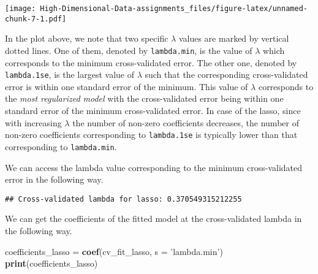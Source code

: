 \documentclass[
]{book}
\newenvironment{Shaded}{\begin{snugshade}}{\end{snugshade}}
\newcommand{\DataTypeTok}[1]{\textcolor[rgb]{0.13,0.29,0.53}{#1}}
\newcommand{\KeywordTok}[1]{\textcolor[rgb]{0.13,0.29,0.53}{\textbf{#1}}}
\newcommand{\NormalTok}[1]{#1}
\newcommand{\OperatorTok}[1]{\textcolor[rgb]{0.81,0.36,0.00}{\textbf{#1}}}
\newcommand{\StringTok}[1]{\textcolor[rgb]{0.31,0.60,0.02}{#1}}
\begin{document}
\texttt{[image: High-Dimensional-Data-assignments\_files/figure-latex/unnamed-chunk-7-1.pdf]}

In the plot above, we note that two specific \(\lambda\) values are marked by vertical dotted lines. One of them, denoted by \texttt{lambda.min}, is the value of \(\lambda\) which corresponds to the minimum cross-validated error. The other one, denoted by \texttt{lambda.1se}, is the largest value of \(\lambda\) such that the corresponding cross-validated error is within one standard error of the minimum. This value of \(\lambda\) corresponds to the \emph{most regularized model} with the cross-validated error being within one standard error of the minimum cross-validated error. In case of the lasso, since with increasing \(\lambda\) the number of non-zero coefficients decreases, the number of non-zero coefficients corresponding to \texttt{lambda.1se} is typically lower than that corresponding to \texttt{lambda.min}.

We can access the lambda value corresponding to the minimum cross-validated error in the following way.

\begin{Shaded}
\end{Shaded}

\begin{verbatim}
## Cross-validated lambda for lasso: 0.370549315212255
\end{verbatim}

We can get the coefficients of the fitted model at the cross-validated lambda in the following way.

\begin{Shaded}
\begin{Highlighting}[]
\NormalTok{coefficients_lasso =}\StringTok{ }\KeywordTok{coef}\NormalTok{(cv_fit_lasso, }\DataTypeTok{s =} \StringTok{'lambda.min'}\NormalTok{)}
\KeywordTok{print}\NormalTok{(coefficients_lasso)}
\end{Highlighting}
\end{Shaded}
\end{document}
